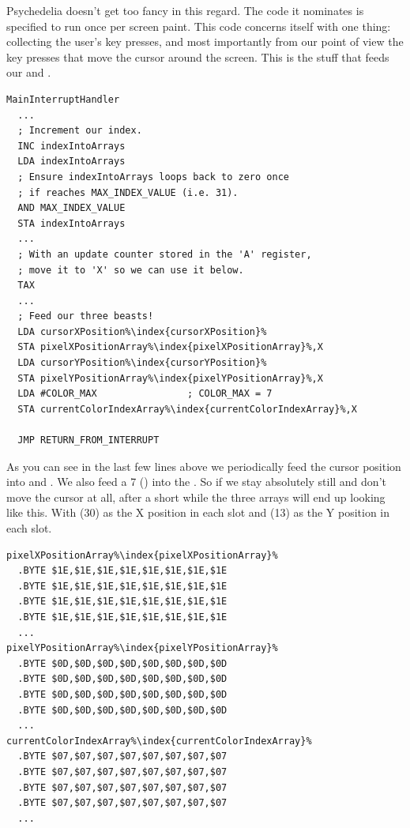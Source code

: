 Psychedelia doesn't get too fancy in this regard. The code it nominates is specified to run once per screen paint. This code concerns itself
with one thing: collecting the user's key presses, and most importantly from our point of view the key presses that move the cursor around
the screen. This is the stuff that feeds our  and .

\begin{lstlisting}[escapechar=\%]
MainInterruptHandler   
  ...
  ; Increment our index.
  INC indexIntoArrays
  LDA indexIntoArrays
  ; Ensure indexIntoArrays loops back to zero once
  ; if reaches MAX_INDEX_VALUE (i.e. 31).
  AND MAX_INDEX_VALUE
  STA indexIntoArrays
  ...
  ; With an update counter stored in the 'A' register,
  ; move it to 'X' so we can use it below.
  TAX
  ...
  ; Feed our three beasts!
  LDA cursorXPosition%\index{cursorXPosition}%
  STA pixelXPositionArray%\index{pixelXPositionArray}%,X
  LDA cursorYPosition%\index{cursorYPosition}%
  STA pixelYPositionArray%\index{pixelYPositionArray}%,X
  LDA #COLOR_MAX                ; COLOR_MAX = 7
  STA currentColorIndexArray%\index{currentColorIndexArray}%,X

  JMP RETURN_FROM_INTERRUPT
\end{lstlisting}

As you can see in the last few lines above we periodically feed the cursor position into  and .
We also feed a 7 () into the . So if we stay absolutely still and don't move the cursor at all, after
a short while the three arrays will end up looking like this. With  (30) as the X position in each slot and  (13) as the Y
position in each slot.
\clearpage

\begin{lstlisting}[escapechar=\%]
pixelXPositionArray%\index{pixelXPositionArray}%   
  .BYTE $1E,$1E,$1E,$1E,$1E,$1E,$1E,$1E
  .BYTE $1E,$1E,$1E,$1E,$1E,$1E,$1E,$1E
  .BYTE $1E,$1E,$1E,$1E,$1E,$1E,$1E,$1E
  .BYTE $1E,$1E,$1E,$1E,$1E,$1E,$1E,$1E
  ...
pixelYPositionArray%\index{pixelYPositionArray}%   
  .BYTE $0D,$0D,$0D,$0D,$0D,$0D,$0D,$0D
  .BYTE $0D,$0D,$0D,$0D,$0D,$0D,$0D,$0D
  .BYTE $0D,$0D,$0D,$0D,$0D,$0D,$0D,$0D
  .BYTE $0D,$0D,$0D,$0D,$0D,$0D,$0D,$0D
  ...
currentColorIndexArray%\index{currentColorIndexArray}%   
  .BYTE $07,$07,$07,$07,$07,$07,$07,$07
  .BYTE $07,$07,$07,$07,$07,$07,$07,$07
  .BYTE $07,$07,$07,$07,$07,$07,$07,$07
  .BYTE $07,$07,$07,$07,$07,$07,$07,$07
  ...
\end{lstlisting}

